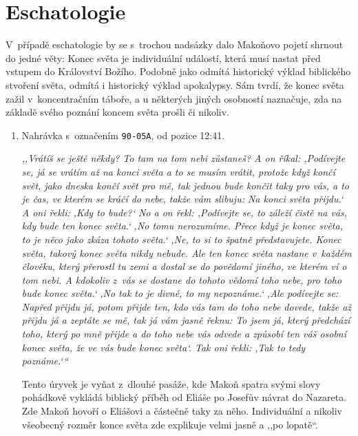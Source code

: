 \section{Eschatologie}

V~případě eschatologie by se s~trochou nadsázky dalo Makoňovo pojetí shrnout do
jedné věty: Konec světa je individuální událostí, která musí nastat před vstupem
do Království Božího. Podobně jako odmítá historický výklad biblického stvoření
světa, odmítá i historický výklad apokalypsy. Sám tvrdí, že konec světa zažil
v~koncentračním táboře, a u některých jiných osobností naznačuje, zda na základě
svého poznání koncem světa prošli či nikoliv.

\begin{enumerate}

\item{
Nahrávka s~označením \texttt{90-05A}, od pozice 12:41.

\textit{%
,,Vrátíš se ještě někdy? To tam na tom nebi zůstaneš? A on říkal: ,Podívejte se,
já se vrátím až na konci světa a to se musím vrátit, protože když končí svět,
jako dneska končí svět pro mě, tak jednou bude končit taky pro vás, a to je čas,
ve kterém se kráčí do nebe, takže vám slibuju: Na konci světa přijdu.` A oni
řekli: ,Kdy to bude?{}` No a on řekl: ,Podívejte se, to záleží čistě na vás, kdy
bude ten konec světa.` ,No tomu nerozumíme. Přece když je konec světa, to je
něco jako zkáza tohoto světa.` ,Ne, to si to špatně představujete. Konec světa,
takový konec světa nikdy nebude. Ale ten konec světa nastane v~každém člověku,
který přerostl tu zemi a dostal se do povědomí jiného, ve kterém ví o tom nebi.
A kdokoliv z~vás se dostane do tohoto vědomí toho nebe, pro toho bude konec
světa.` ,No tak to je divné, to my nepoznáme.` ,Ale podívejte se: Napřed přijdu
já, potom přijde ten, kdo vás tam do toho nebe dovede, takže až přijdu já a
zeptáte se mě, tak já vám jasně řeknu: \guillemotright{}To jsem já, který
předchází toho, který po mně přijde a do toho nebe vás odvede a způsobí ten váš
osobní konec světa, že ve vás bude konec světa\guillemotleft{}`. Tak oni řekli:
,Tak to tedy poznáme.`{}``
}

Tento úryvek je vyňat z~dlouhé pasáže, kde Makoň spatra svými slovy pohádkově
        vykládá biblický příběh od Eliáše po Josefův návrat do Nazareta. Zde
        Makoň hovoří o Eliášovi a částečně taky za něho.
Individuální a nikoliv všeobecný rozměr konce světa zde explikuje velmi jasně a
,,po lopatě``.

}


\end{enumerate}
